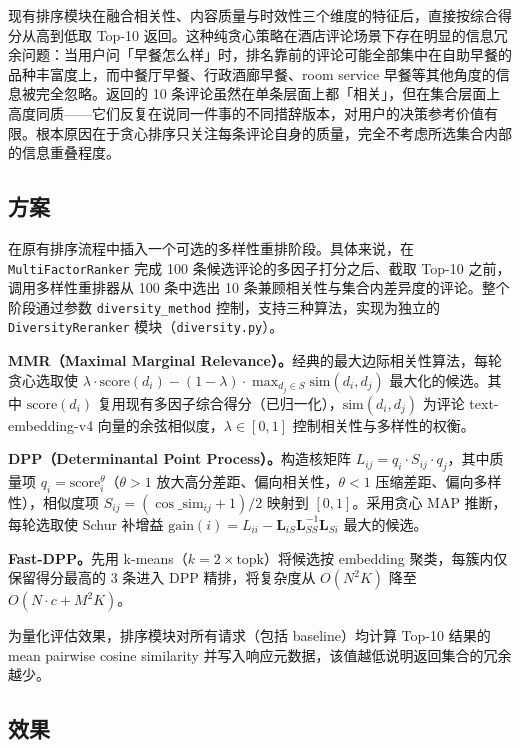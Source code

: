\documentclass[11pt]{ctexart}
\begin{document}
现有排序模块在融合相关性、内容质量与时效性三个维度的特征后，直接按综合得分从高到低取 Top-10 返回。这种纯贪心策略在酒店评论场景下存在明显的信息冗余问题：当用户问「早餐怎么样」时，排名靠前的评论可能全部集中在自助早餐的品种丰富度上，而中餐厅早餐、行政酒廊早餐、room service 早餐等其他角度的信息被完全忽略。返回的 10 条评论虽然在单条层面上都「相关」，但在集合层面上高度同质——它们反复在说同一件事的不同措辞版本，对用户的决策参考价值有限。根本原因在于贪心排序只关注每条评论自身的质量，完全不考虑所选集合内部的信息重叠程度。

\subsection{方案}

在原有排序流程中插入一个可选的多样性重排阶段。具体来说，在 \texttt{MultiFactorRanker} 完成 100 条候选评论的多因子打分之后、截取 Top-10 之前，调用多样性重排器从 100 条中选出 10 条兼顾相关性与集合内差异度的评论。整个阶段通过参数 \texttt{diversity\_method} 控制，支持三种算法，实现为独立的 \texttt{DiversityReranker} 模块（\texttt{diversity.py}）。

\textbf{MMR（Maximal Marginal Relevance）。}经典的最大边际相关性算法，每轮贪心选取使 \(\lambda\cdot\text{score}(d_i)-(1-\lambda)\cdot\max_{d_j\in S}\text{sim}(d_i,d_j)\) 最大化的候选。其中 \(\text{score}(d_i)\) 复用现有多因子综合得分（已归一化），\(\text{sim}(d_i,d_j)\) 为评论 text-embedding-v4 向量的余弦相似度，\(\lambda\in[0,1]\) 控制相关性与多样性的权衡。

\textbf{DPP（Determinantal Point Process）。}构造核矩阵 \(L_{ij}=q_i\cdot S_{ij}\cdot q_j\)，其中质量项 \(q_i=\text{score}_i^{\theta}\)（\(\theta>1\) 放大高分差距、偏向相关性，\(\theta<1\) 压缩差距、偏向多样性），相似度项 \(S_{ij}=(\cos\_\text{sim}_{ij}+1)/2\) 映射到 \([0,1]\)。采用贪心 MAP 推断，每轮选取使 Schur 补增益 \(\text{gain}(i)=L_{ii}-\mathbf{L}_{iS}\mathbf{L}_{SS}^{-1}\mathbf{L}_{Si}\) 最大的候选。

\textbf{Fast-DPP。}先用 k-means（\(k=2\times\text{topk}\)）将候选按 embedding 聚类，每簇内仅保留得分最高的 3 条进入 DPP 精排，将复杂度从 \(O(N^2K)\) 降至 \(O(N\cdot c+M^2K)\)。

为量化评估效果，排序模块对所有请求（包括 baseline）均计算 Top-10 结果的 mean pairwise cosine similarity 并写入响应元数据，该值越低说明返回集合的冗余越少。

\subsection{效果}
\end{document}
